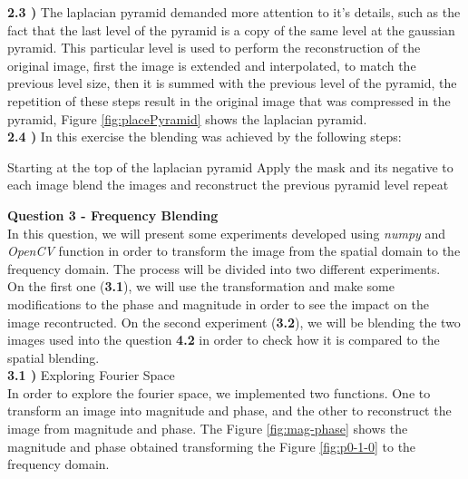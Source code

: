 \documentclass[12pt,a4paper]{article}
\begin{document}
\textbf{2.3 )} The laplacian pyramid demanded more attention to it's details, such as the fact that the last level of the pyramid is a copy of the same level at the gaussian pyramid. This particular level is used to perform the reconstruction of the original image, first the image is extended and interpolated, to match the previous level size, then it is summed with the previous level of the pyramid, the repetition of these steps result in the original image that was compressed in the pyramid, Figure \ref{fig:placePyramid} shows the laplacian pyramid. \\

\textbf{2.4 )} In this exercise the blending was achieved by the following steps:

Starting at the top of the laplacian pyramid
Apply the mask and its negative to each image
blend the images and reconstruct the previous pyramid level
repeat

\newpage

\textbf{\LARGE Question 3 - Frequency Blending} \\

In this question, we will present some experiments developed using \emph{numpy} and \emph{OpenCV} function in order to transform the image from the spatial domain to the frequency domain. The process will be divided into two different experiments. \\

On the first one (\textbf{3.1}), we will use the transformation and make some modifications to the phase and magnitude in order to see the impact on the image recontructed. On the second experiment (\textbf{3.2}), we will be blending the two images used into the question \textbf{4.2} in order to check how it is compared to the spatial blending. \\

\textbf{3.1 )} Exploring Fourier Space \\

In order to explore the fourier space, we implemented two functions. One to transform an image into magnitude and phase, and the other to reconstruct the image from magnitude and phase. The Figure \ref{fig:mag-phase} shows the magnitude and phase obtained transforming the Figure \ref{fig:p0-1-0} to the frequency domain. \\
\end{document}
